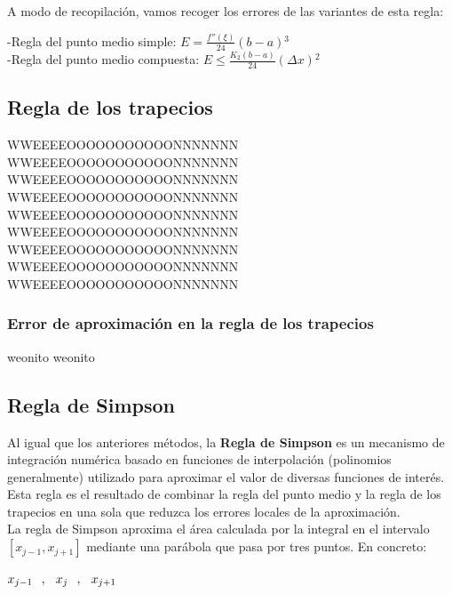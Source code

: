 \documentclass{article}
\begin{document}
			A modo de recopilación, vamos recoger los errores de las variantes de esta regla:
			
			\begin{flushleft}
				-Regla del punto medio simple: $E = \frac{f''(\xi)}{24} (b - a){^3}$\\
				-Regla del punto medio compuesta: $E \leq \frac{K_2(b-a)}{24}(\Delta x){^2}$\\
			\end{flushleft}
			

	\subsection{Regla de los trapecios}

	WWEEEEOOOOOOOOOOONNNNNNN  	WWEEEEOOOOOOOOOOONNNNNNN  	WWEEEEOOOOOOOOOOONNNNNNN  	WWEEEEOOOOOOOOOOONNNNNNN  	WWEEEEOOOOOOOOOOONNNNNNN  	WWEEEEOOOOOOOOOOONNNNNNN  	WWEEEEOOOOOOOOOOONNNNNNN  	WWEEEEOOOOOOOOOOONNNNNNN  	WWEEEEOOOOOOOOOOONNNNNNN  
	
	\subsubsection{Error de aproximación en la regla de los trapecios}
	
	weonito weonito

	\subsection{Regla de Simpson}
	
	Al igual que los anteriores métodos, la \textbf{Regla de Simpson} es un mecanismo de integración numérica basado en funciones de interpolación (polinomios generalmente) utilizado para aproximar el valor de diversas funciones de interés. Esta regla es el resultado de combinar la regla del punto medio y la regla de los trapecios en una sola que reduzca los errores locales de la aproximación.\\
	
	La regla de Simpson aproxima el área calculada por la integral en el intervalo $[x_{j-1} , x_{j+1}]$ mediante una parábola que pasa por tres puntos. En concreto:
	
	\begin{center}
		$x_{j-1} \hspace{2.5mm},\hspace{2.5mm} x_{j} \hspace{2.5mm},\hspace{2.5mm} x_{j+1}$
	\end{center}
	
\end{document}
